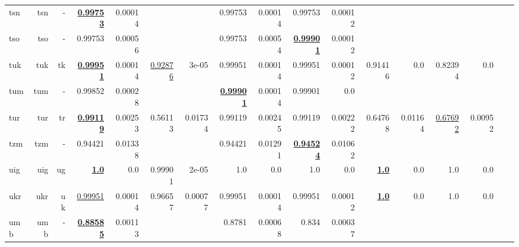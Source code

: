 \documentclass[11pt]{article}
\begin{document}
\begin{table*}[h]
{\begin{tabular}{lrrrrrrrrrrrrrrrr}
tsn         & tsn         & -         & \textbf{\underline{0.99753}}         & 0.00014         &          &          & 0.99753         & 0.00014         & 0.99753         & 0.00012         &          &          &          &          \\
tso         & tso         & -         & 0.99753         & 0.00056         &          &          & 0.99753         & 0.00054         & \textbf{\underline{0.99901}}         & 0.00012         &          &          &          &          \\
tuk         & tuk         & tk         & \textbf{\underline{0.99951}}         & 0.00014         & \underline{0.92876}         & 3e-05         & 0.99951         & 0.00014         & 0.99951         & 0.00012         & 0.91416         & 0.0         & 0.82394         & 0.0         \\
tum         & tum         & -         & 0.99852         & 0.00028         &          &          & \textbf{\underline{0.99901}}         & 0.00014         & 0.99901         & 0.0         &          &          &          &          \\
tur         & tur         & tr         & \textbf{\underline{0.99119}}         & 0.00253         & 0.56113         & 0.01734         & 0.99119         & 0.00245         & 0.99119         & 0.00222         & 0.64768         & 0.01164         & \underline{0.67692}         & 0.00952         \\
tzm         & tzm         & -         & 0.94421         & 0.01338         &          &          & 0.94421         & 0.01291         & \textbf{\underline{0.94524}}         & 0.01062         &          &          &          &          \\
uig         & uig         & ug         & \textbf{\underline{1.0}}         & 0.0         & 0.99901         & 2e-05         & 1.0         & 0.0         & 1.0         & 0.0         & \textbf{\underline{1.0}}         & 0.0         & 1.0         & 0.0         \\
ukr         & ukr         & uk         & \underline{0.99951}         & 0.00014         & 0.96657         & 0.00077         & 0.99951         & 0.00014         & 0.99951         & 0.00012         & \textbf{\underline{1.0}}         & 0.0         & 1.0         & 0.0         \\
umb         & umb         & -         & \textbf{\underline{0.88585}}         & 0.00113         &          &          & 0.8781         & 0.00068         & 0.834         & 0.00037         &          &          &          &          \\

\end{tabular}}
\end{table*}
\end{document}
